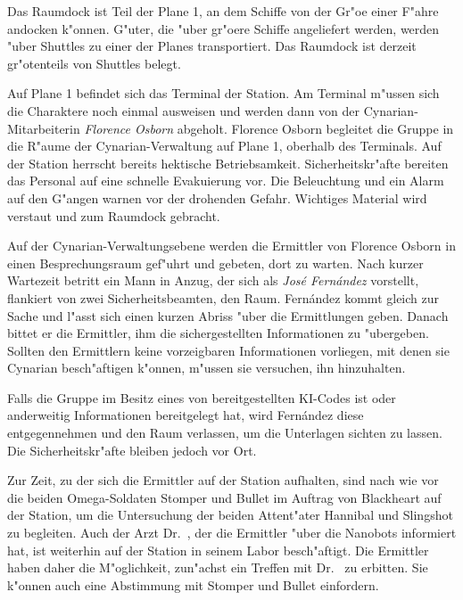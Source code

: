 Das Raumdock ist Teil der Plane 1, an dem Schiffe von der Gr"o\3e einer F"ahre andocken k"onnen. G"uter, die "uber gr"o\3ere Schiffe angeliefert werden, werden "uber Shuttles zu einer der Planes transportiert. Das Raumdock ist derzeit gr"o\3tenteils von Shuttles belegt.

Auf Plane 1 befindet sich das Terminal der Station. Am Terminal m"ussen sich die Charaktere noch einmal ausweisen und werden dann von der Cynarian-Mitarbeiterin \emph{Florence Osborn} abgeholt. Florence Osborn begleitet die Gruppe in die R"aume der Cynarian-Verwaltung auf Plane 1, oberhalb des Terminals. Auf der Station herrscht bereits hektische Betriebsamkeit. Sicherheitskr"afte bereiten das Personal auf eine schnelle Evakuierung vor. Die Beleuchtung und ein Alarm auf den G"angen warnen vor der drohenden Gefahr. Wichtiges Material wird verstaut und zum Raumdock gebracht.

Auf der Cynarian-Verwaltungsebene werden die Ermittler von Florence Osborn in einen Besprechungsraum gef"uhrt und gebeten, dort zu warten. Nach kurzer Wartezeit betritt ein Mann in Anzug, der sich als \emph{Jos\'e Fern\'andez} vorstellt, flankiert von zwei Sicherheitsbeamten, den Raum. Fern\'andez kommt gleich zur Sache und l"asst sich einen kurzen Abriss "uber die Ermittlungen geben. Danach bittet er die Ermittler, ihm die sichergestellten Informationen zu "ubergeben. Sollten den Ermittlern keine vorzeigbaren Informationen vorliegen, mit denen sie Cynarian besch"aftigen k"onnen, m"ussen sie versuchen, ihn hinzuhalten. 

Falls die Gruppe im Besitz eines von \ml{} bereitgestellten KI-Codes ist oder anderweitig Informationen bereitgelegt hat, wird Fern\'andez diese entgegennehmen und den Raum verlassen, um die Unterlagen sichten zu lassen. Die Sicherheitskr"afte bleiben jedoch vor Ort.

Zur Zeit, zu der sich die Ermittler auf der Station aufhalten, sind nach wie vor die beiden Omega-Soldaten Stomper und Bullet im Auftrag von Blackheart auf der Station, um die Untersuchung der beiden Attent"ater Hannibal und Slingshot zu begleiten. Auch der Arzt  
Dr.~, der die Ermittler "uber die Nanobots informiert hat, ist weiterhin auf der Station in seinem Labor besch"aftigt. Die Ermittler haben daher die M"oglichkeit, zun"achst ein Treffen mit Dr.~ zu erbitten. Sie k"onnen auch eine Abstimmung mit Stomper und Bullet einfordern.

